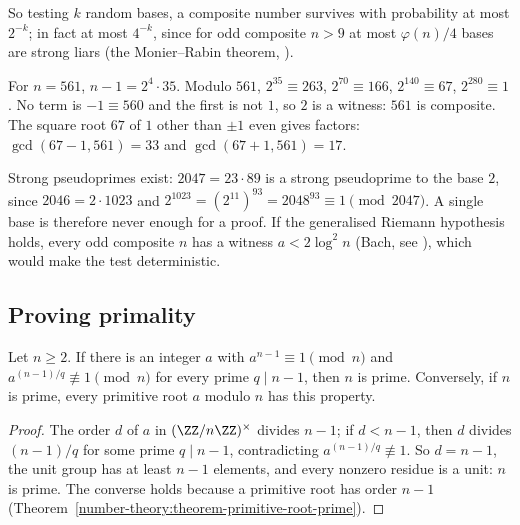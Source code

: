 So testing $k$ random bases, a composite number survives with probability at most $2^{-k}$; in fact at most $4^{-k}$, since for odd composite $n > 9$ at most $\varphi(n)/4$ bases are strong liars
(the Monier--Rabin theorem, \cite{crandall-pomerance}).

\begin{example}\label{prime-numbers:example-miller-rabin-561}
For $n = 561$, $n - 1 = 2^4 \cdot 35$. Modulo $561$, $2^{35} \equiv 263$, $2^{70} \equiv 166$, $2^{140} \equiv 67$, $2^{280} \equiv 1$. No term is $-1 \equiv 560$ and the first is not $1$, so $2$ is a witness:
$561$ is composite. The square root $67$ of $1$ other than $\pm 1$ even gives factors: $\gcd(67 - 1, 561) = 33$ and $\gcd(67 + 1, 561) = 17$.
\end{example}

\begin{counterexample}\label{prime-numbers:counterexample-strong-pseudoprime}
Strong pseudoprimes exist: $2047 = 23 \cdot 89$ is a strong pseudoprime to the base $2$, since $2046 = 2 \cdot 1023$ and $2^{1023} = (2^{11})^{93} = 2048^{93} \equiv 1 \pmod{2047}$. A single base is
therefore never enough for a proof. If the generalised Riemann hypothesis holds, every odd composite $n$ has a witness $a < 2\log^2n$ (Bach, see \cite{crandall-pomerance}), which would make the test deterministic.
\end{counterexample}

\subsection{Proving primality}\label{prime-numbers:subsection-proving}

\begin{theorem}[Lucas]\label{prime-numbers:theorem-lucas}
Let $n \geq 2$. If there is an integer $a$ with $a^{n-1} \equiv 1 \pmod n$ and $a^{(n-1)/q} \not\equiv 1 \pmod n$ for every prime $q \mid n - 1$, then $n$ is prime. Conversely, if $n$ is prime, every
primitive root $a$ modulo $n$ has this property.
\end{theorem}

\begin{proof}
The order $d$ of $a$ in $(\ZZ/n\ZZ)^\times$ divides $n - 1$; if $d < n - 1$, then $d$ divides $(n - 1)/q$ for some prime $q \mid n - 1$, contradicting $a^{(n-1)/q} \not\equiv 1$. So $d = n - 1$, the unit
group has at least $n - 1$ elements, and every nonzero residue is a unit: $n$ is prime. The converse holds because a primitive root has order $n - 1$ (Theorem~\ref{number-theory:theorem-primitive-root-prime}).
\end{proof}

